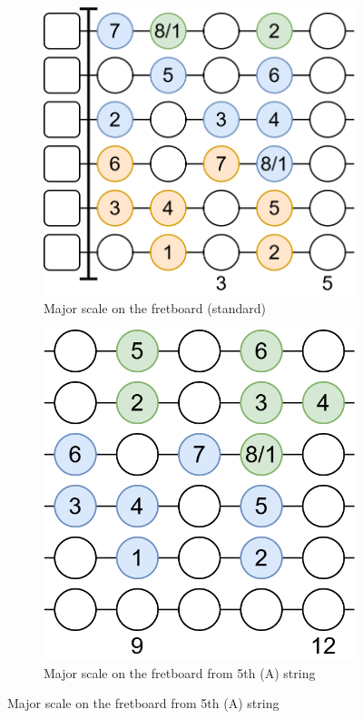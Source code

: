 \newpage

\begin{figure}[h]
	\begin{subfigure}[b]{0.45\textwidth}
		\centering
		\includegraphics[height=0.18\textheight]{../../Images/guitar_major_scale_standard.png}
		\caption{Major scale on the fretboard (standard)}
		\label{fig:guitar_major_scale_fretboard_standard}
	\end{subfigure}
	\hfill
	\begin{subfigure}[b]{0.45\textwidth}
		\centering
		\includegraphics[height=0.18\textheight]{../../Images/guitar_major_scale_standard_start_5th_string.png}
		\caption{Major scale on the fretboard from 5th (A) string}
		\label{fig:guitar_major_scale_fretboard_standard_start_5th_string}
	\end{subfigure}
	

\end{figure}
